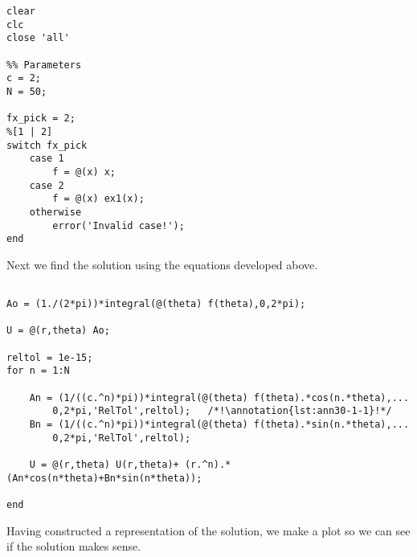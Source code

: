 \begin{lstlisting}[name=lec30-ex1, style=myMatlab]
clear
clc
close 'all'

%% Parameters
c = 2;
N = 50;

fx_pick = 2;
%[1 | 2]
switch fx_pick
    case 1
        f = @(x) x;
    case 2
        f = @(x) ex1(x);
    otherwise
        error('Invalid case!');    
end

\end{lstlisting}

\noindent Next we find the solution using the equations developed above.

\begin{lstlisting}[name=lec30-ex1,style=myMatlab]
%% solve the problem

Ao = (1./(2*pi))*integral(@(theta) f(theta),0,2*pi);

U = @(r,theta) Ao;

reltol = 1e-15;
for n = 1:N
   
    An = (1/((c.^n)*pi))*integral(@(theta) f(theta).*cos(n.*theta),...
        0,2*pi,'RelTol',reltol);   /*!\annotation{lst:ann30-1-1}!*/
    Bn = (1/((c.^n)*pi))*integral(@(theta) f(theta).*sin(n.*theta),...
        0,2*pi,'RelTol',reltol);  
   
    U = @(r,theta) U(r,theta)+ (r.^n).*(An*cos(n*theta)+Bn*sin(n*theta));
    
end
\end{lstlisting}

\vspace{4.0cm}

\noindent Having constructed a representation of the solution, we make a plot so we can see if the solution makes sense.

